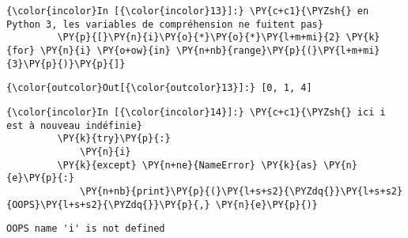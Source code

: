     \begin{Verbatim}[commandchars=\\\{\}]
{\color{incolor}In [{\color{incolor}13}]:} \PY{c+c1}{\PYZsh{} en Python 3, les variables de compréhension ne fuitent pas}
         \PY{p}{[}\PY{n}{i}\PY{o}{*}\PY{o}{*}\PY{l+m+mi}{2} \PY{k}{for} \PY{n}{i} \PY{o+ow}{in} \PY{n+nb}{range}\PY{p}{(}\PY{l+m+mi}{3}\PY{p}{)}\PY{p}{]}
\end{Verbatim}


\begin{Verbatim}[commandchars=\\\{\}]
{\color{outcolor}Out[{\color{outcolor}13}]:} [0, 1, 4]
\end{Verbatim}
            
    \begin{Verbatim}[commandchars=\\\{\}]
{\color{incolor}In [{\color{incolor}14}]:} \PY{c+c1}{\PYZsh{} ici i est à nouveau indéfinie}
         \PY{k}{try}\PY{p}{:}
             \PY{n}{i}
         \PY{k}{except} \PY{n+ne}{NameError} \PY{k}{as} \PY{n}{e}\PY{p}{:}
             \PY{n+nb}{print}\PY{p}{(}\PY{l+s+s2}{\PYZdq{}}\PY{l+s+s2}{OOPS}\PY{l+s+s2}{\PYZdq{}}\PY{p}{,} \PY{n}{e}\PY{p}{)}
\end{Verbatim}


    \begin{Verbatim}[commandchars=\\\{\}]
OOPS name 'i' is not defined

    \end{Verbatim}


    
    
    

